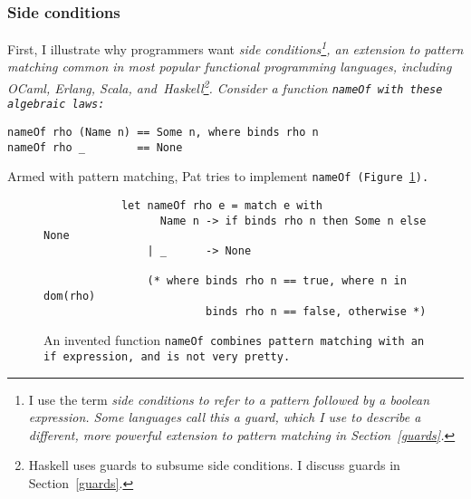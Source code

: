 \documentclass[manuscript,screen,review, 12pt]{acmart}
\begin{document}
    

    

\subsubsection{Side conditions}

    First, I illustrate why programmers want \it{side conditions}\footnote{I
    use the term \it{side conditions} to refer to a pattern followed by a
    boolean expression. Some languages call this a \it{guard}, which I use to
    describe a different, more powerful extension to pattern matching in
    Section~\ref{guards}.}, an extension to pattern matching common in most
    popular functional programming languages, including OCaml, Erlang, Scala,
    and~Haskell\footnote{Haskell uses guards to subsume side conditions. I
    discuss guards in Section~\ref{guards}.}. Consider a function \tt{nameOf}
    with these algebraic laws: 

    \begin{minipage}[t]{\textwidth}
        \centering 
        \begin{verbatim}
nameOf rho (Name n) == Some n, where binds rho n
nameOf rho _        == None 
        \end{verbatim}
    \end{minipage}

    Armed with pattern matching, Pat tries to implement \tt{nameOf}
    (Figure~\ref{fig:ifnameof}).

    \begin{figure}[ht]
        \begin{verbatim}
            let nameOf rho e = match e with 
                  Name n -> if binds rho n then Some n else None
                | _      -> None

                (* where binds rho n == true, where n in dom(rho)
                         binds rho n == false, otherwise *)
            \end{verbatim}    
        \caption{An invented function \tt{nameOf} combines pattern matching with
        an \tt{if} expression, and is not very pretty.}    
        \label{fig:ifnameof}
    \end{figure}
    
\end{document}
